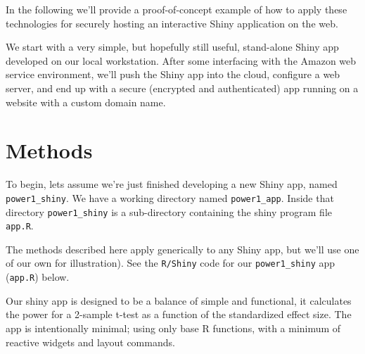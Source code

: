 \documentclass[
  letterpaper,
  DIV=11,
  numbers=noendperiod,
  oneside]{scrartcl}
\begin{document}
In the following we'll provide a proof-of-concept example of how to
apply these technologies for securely hosting an interactive Shiny
application on the web.

We start with a very simple, but hopefully still useful, stand-alone
Shiny app developed on our local workstation. After some interfacing
with the Amazon web service environment, we'll push the Shiny app into
the cloud, configure a web server, and end up with a secure (encrypted
and authenticated) app running on a website with a custom domain name.

\hypertarget{methods}{%
\section{Methods}\label{methods}}

To begin, lets assume we're just finished developing a new Shiny app,
named \texttt{power1\_shiny}. We have a working directory named
\texttt{power1\_app}. Inside that directory \texttt{power1\_shiny} is a
sub-directory containing the shiny program file \texttt{app.R}.

The methods described here apply generically to any Shiny app, but we'll
use one of our own for illustration). See the \texttt{R/Shiny} code for
our \texttt{power1\_shiny} app (\texttt{app.R}) below.

Our shiny app is designed to be a balance of simple and functional, it
calculates the power for a 2-sample t-test as a function of the
standardized effect size. The app is intentionally minimal; using only
base R functions, with a minimum of reactive widgets and layout
commands.
\end{document}
